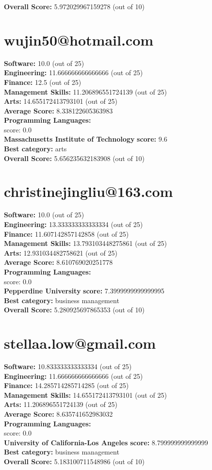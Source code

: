\documentclass{article}
\begin{document}
\textbf{Overall Score: }5.972029967159278 (out of 10)\section{wujin50@hotmail.com}
\textbf{Software:} 10.0 (out of 25)\\
\textbf{Engineering: } 11.666666666666666 (out of 25)\\
\textbf{Finance:} 12.5 (out of 25)\\
\textbf{Management Skills:} 11.206896551724139 (out of 25)\\
\textbf{Arts:} 14.655172413793101 (out of 25)\\
\textbf{Average Score: } 8.338122605363983\\
\textbf{Programming Languages:} \\
score: 0.0\\
\textbf{Massachusetts Institute of Technology} \textbf{score:} 9.6\\
\textbf{Best category: } arts\\
\textbf{Overall Score: }5.656235632183908 (out of 10)\section{christinejingliu@163.com}
\textbf{Software:} 10.0 (out of 25)\\
\textbf{Engineering: } 13.333333333333334 (out of 25)\\
\textbf{Finance:} 11.607142857142858 (out of 25)\\
\textbf{Management Skills:} 13.793103448275861 (out of 25)\\
\textbf{Arts:} 12.931034482758621 (out of 25)\\
\textbf{Average Score: } 8.610769020251778\\
\textbf{Programming Languages:} \\
score: 0.0\\
\textbf{Pepperdine University} \textbf{score:} 7.3999999999999995\\
\textbf{Best category: } business management\\
\textbf{Overall Score: }5.280925697865353 (out of 10)\section{stellaa.low@gmail.com}
\textbf{Software:} 10.833333333333334 (out of 25)\\
\textbf{Engineering: } 11.666666666666666 (out of 25)\\
\textbf{Finance:} 14.285714285714285 (out of 25)\\
\textbf{Management Skills:} 14.655172413793101 (out of 25)\\
\textbf{Arts:} 11.206896551724139 (out of 25)\\
\textbf{Average Score: } 8.635741652983032\\
\textbf{Programming Languages:} \\
score: 0.0\\
\textbf{University of California-Los Angeles} \textbf{score:} 8.799999999999999\\
\textbf{Best category: } business management\\
\textbf{Overall Score: }5.183100711548986 (out of 10)
\end{document}
